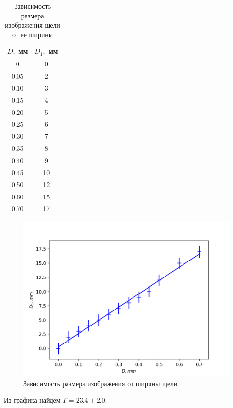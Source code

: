 \documentclass[a4paper,12pt]{article}
\begin{document}
\begin{table}[H]
    \centering
    \caption{Зависимость размера изображения щели от ее ширины}
    \begin{tabular}{|c|c|} \hline
        $D,$ мм & $D_1,$ мм \\ \hline
        0 & 0 \\ \hline
        0.05 & 2 \\ \hline
        0.10 & 3 \\ \hline
        0.15 & 4 \\ \hline
        0.20 & 5 \\ \hline
        0.25 & 6 \\ \hline
        0.30 & 7 \\ \hline
        0.35 & 8 \\ \hline
        0.40 & 9 \\ \hline
        0.45 & 10 \\ \hline
        0.50 & 12 \\ \hline
        0.60 & 15 \\ \hline
        0.70 & 17 \\ \hline
    \end{tabular}
\end{table}

\begin{figure}[H]
    \centering
    \includegraphics[scale=0.5]{I.png}
    \caption{Зависимость размера изображения от ширины щели}
\end{figure}

\noindent
Из графика найдем $\Gamma = 23.4 \pm 2.0$.
\end{document}

